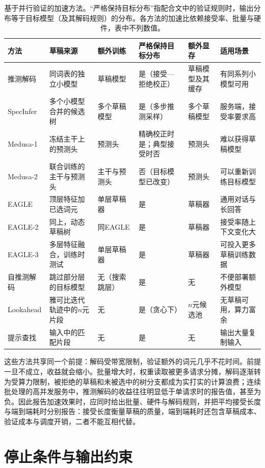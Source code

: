 \begin{table}[htbp]
 \small
 \begin{tabularx}{\linewidth}{@{}p{20mm}p{30mm}p{20mm}p{26mm}p{20mm}X@{}}
  \toprule
  方法 & 草稿来源 & 额外训练 & 严格保持目标分布 & 额外显存 & 适用场景\\
  \midrule
  推测解码 & 同词表的独立小模型 & 草稿模型 & 是（接受—拒绝校正） & 草稿模型及其缓存 & 有同系列小模型可用\\
  SpecInfer & 多个小模型合并的候选树 & 多个草稿模型 & 是（多步推测采样） & 多个草稿模型 & 服务端，接受率要求高\\
  Medusa-1 & 冻结主干上的预测头 & 预测头 & 精确校正时是；典型接受时否 & 预测头 & 难以获得草稿模型\\
  Medusa-2 & 联合训练的主干与预测头 & 主干与预测头 & 否（目标模型已改变） & 预测头 & 可以重新训练目标模型\\
  EAGLE & 顶层特征加已选词元 & 单层草稿器 & 是 & 草稿器 & 通用对话与长回答\\
  EAGLE-2 & 同上，动态草稿树 & 同EAGLE & 是 & 草稿器 & 接受率随上下文变化大\\
  EAGLE-3 & 多层特征融合，训练时测试 & 单层草稿器 & 是 & 草稿器 & 可投入更多草稿训练数据\\
  自推测解码 & 跳过部分层的目标模型 & 无（搜索跳层） & 是 & 无 & 不便部署额外模型\\
  Lookahead & 雅可比迭代轨迹中的$n$元片段 & 无 & 是（贪心下） & $n$元候选池 & 无草稿可用，算力富余\\
  提示查找 & 输入中的匹配片段 & 无 & 是 & 无 & 输出大量复制输入\\
  \bottomrule
 \end{tabularx}
 \caption{基于并行验证的加速方法。“严格保持目标分布”指配合文中的验证规则时，输出分布等于目标模型（及其解码规则）的分布。各方法的加速比依赖接受率、批量与硬件，表中不列数值。}
 \label{tab:nlp-inference-acceleration}
\end{table}

这些方法共享同一个前提：解码受带宽限制，验证额外的词元几乎不花时间。前提一旦不成立，收益就会缩小。批量增大时，权重读取被更多请求分摊，解码逐渐转为受算力限制，被拒绝的草稿和未被选中的树分支都成为实打实的计算浪费；连续批处理的高并发服务中，推测解码的收益往往明显低于单请求时的报告值，甚至为负。因此报告加速效果时，应同时给出批量、硬件与解码规则，并把平均接受长度与端到端耗时分别报告：接受长度衡量草稿的质量，端到端耗时还包含草稿成本、验证成本与调度开销，二者不能互相代替。

\section{停止条件与输出约束}
\label{sec:nlp-inference-termination}

